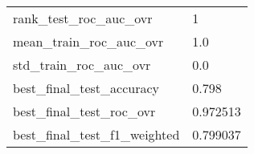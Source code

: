 \begin{tabular}{ll}
rank\_test\_roc\_auc\_ovr       &                                                  1 \\
mean\_train\_roc\_auc\_ovr      &                                                1.0 \\
std\_train\_roc\_auc\_ovr       &                                                0.0 \\
best\_final\_test\_accuracy    &                                              0.798 \\
best\_final\_test\_roc\_ovr     &                                           0.972513 \\
best\_final\_test\_f1\_weighted &                                           0.799037 \\
\bottomrule
\end{tabular}
